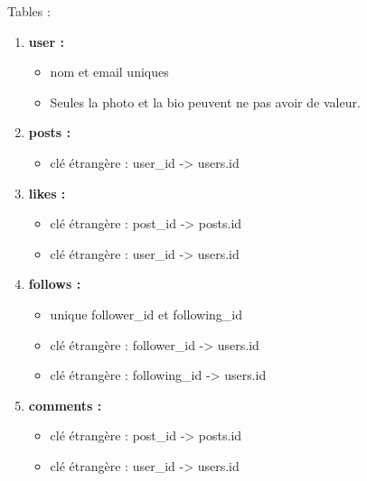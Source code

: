 \documentclass[12pt,a4paper]{article}
\begin{document}
Tables :
\begin{enumerate}
     


\item \textbf{user :}
  
  \begin{itemize}
    
  \item nom et email uniques
  \item Seules la photo et la bio peuvent ne pas avoir de valeur.
  
  \end{itemize}

\item \textbf{posts :}
  
  \begin{itemize}
    
  \item clé étrangère : user\_id -> users.id
  
  \end{itemize}

\item \textbf{likes :}
  
  \begin{itemize}
    
  \item clé étrangère : post\_id -> posts.id
  \item clé étrangère : user\_id -> users.id
  
  \end{itemize}

\item \textbf{follows :}
  
  \begin{itemize}

  \item unique follower\_id et following\_id
  \item clé étrangère : follower\_id -> users.id
  \item clé étrangère : following\_id -> users.id
  
  \end{itemize}

\item \textbf{comments :}
  
  \begin{itemize}
    
  \item clé étrangère : post\_id -> posts.id
  \item clé étrangère : user\_id -> users.id
  
  \end{itemize}
    
\end{enumerate}
\end{document}
